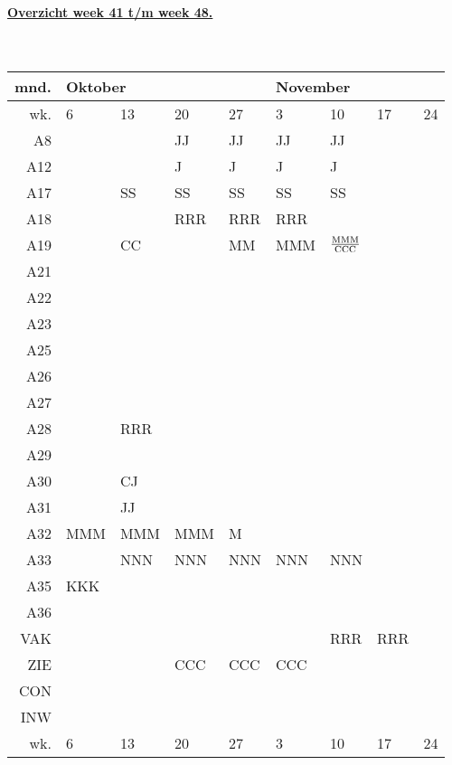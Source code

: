 {\bf
\underline{Overzicht week 41 t/m week 48.}\\ \\ \\
\small
\begin{tabular}{||r||p{3em}|p{3em}|p{3em}|p{3em}||p{3em}|p{3em}|p{3em}|p{3em}||} \hline 
mnd.&\multicolumn{4}{l||}{Oktober}&\multicolumn{4}{l||}{November} \\ \hline 
wk.&6  &13 &20 &27 &  3& 10& 17& 24 \\ \hline \hline
 A8&   &   &JJ &JJ &JJ &JJ &   &    \\ \hline
A12&   &   &J  &J  &J  &J  &   &    \\ \hline
A17&   &SS &SS &SS &SS &SS &   &    \\ \hline
A18&   &   &RRR&RRR&RRR&   &   &    \\ \hline
A19&   &CC &   & MM&MMM&$\frac{\rm MMM}{\rm CCC}$
                           &   &    \\ \hline
A21&   &   &   &   &   &   &   &    \\ \hline
A22&   &   &   &   &   &   &   &    \\ \hline
A23&   &   &   &   &   &   &   &    \\ \hline
A25&   &   &   &   &   &   &   &    \\ \hline
A26&   &   &   &   &   &   &   &    \\ \hline
A27&   &   &   &   &   &   &   &    \\ \hline
A28&   &RRR&   &   &   &   &   &    \\ \hline
A29&   &   &   &   &   &   &   &    \\ \hline
A30&   &CJ &   &   &   &   &   &    \\ \hline
A31&   &JJ &   &   &   &   &   &    \\ \hline
A32&MMM&MMM&MMM&  M&   &   &   &    \\ \hline
A33&   &NNN&NNN&NNN&NNN&NNN&   &    \\ \hline
A35&KKK&   &   &   &   &   &   &    \\ \hline
A36&   &   &   &   &   &   &   &    \\ \hline
VAK&   &   &   &   &   &RRR&RRR&    \\ \hline
ZIE&   &   &CCC&CCC&CCC&   &   &    \\ \hline
CON&   &   &   &   &   &   &   &    \\ \hline
INW&   &   &   &   &   &   &   &    \\ \hline \hline
wk.&6  &13 &20 &27 &  3& 10& 17& 24 \\ \hline

\end{tabular}}
